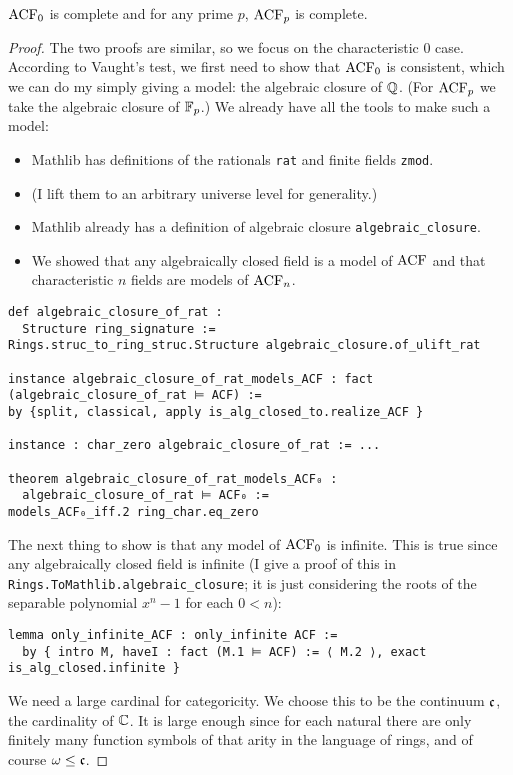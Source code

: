 \begin{prop}
  $\operatorname{ACF}_{0}$ is complete and for any prime $p$, $\operatorname{ACF}_{p}$ is complete.
\end{prop}
\begin{proof}
  The two proofs are similar, so we focus on the characteristic $0$ case.
  According to Vaught's test, we first need to show that $\operatorname{ACF}_{0}$ is consistent,
  which we can do my simply giving a model: the algebraic closure of $\mathbb{Q}$.
  (For $\operatorname{ACF}_{p}$ we take the algebraic closure of $\mathbb{F}_{p}$.)
  We already have all the tools to make such a model:
  \begin{itemize}
    \item Mathlib has definitions of the rationals \texttt{rat} and finite fields \texttt{zmod}.
    \item (I lift them to an arbitrary universe level for generality.)
    \item Mathlib already has a definition of algebraic closure \texttt{algebraic\_closure}.
    \item We showed that any algebraically closed field is a model of $\operatorname{ACF}$
          and that characteristic $n$ fields are models of $\operatorname{ACF}_{n}$.
  \end{itemize}
  \begin{lstlisting}
def algebraic_closure_of_rat :
  Structure ring_signature :=
Rings.struc_to_ring_struc.Structure algebraic_closure.of_ulift_rat

instance algebraic_closure_of_rat_models_ACF : fact (algebraic_closure_of_rat ⊨ ACF) :=
by {split, classical, apply is_alg_closed_to.realize_ACF }

instance : char_zero algebraic_closure_of_rat := ...

theorem algebraic_closure_of_rat_models_ACF₀ :
  algebraic_closure_of_rat ⊨ ACF₀ :=
models_ACF₀_iff.2 ring_char.eq_zero \end{lstlisting}

The next thing to show is that any model of $\operatorname{ACF}_{0}$ is infinite.
This is true since any algebraically closed field is infinite
(I give a proof of this in \texttt{Rings.ToMathlib.algebraic\_closure};
it is just considering the roots of the separable polynomial $x^{n} - 1$ for each $0 < n$):
\begin{lstlisting}
lemma only_infinite_ACF : only_infinite ACF :=
  by { intro M, haveI : fact (M.1 ⊨ ACF) := ⟨ M.2 ⟩, exact is_alg_closed.infinite }\end{lstlisting}

We need a large cardinal for categoricity.
We choose this to be the continuum $\mathfrak{c}$, the cardinality of $\mathbb{C}$.
It is large enough since for each natural there are only finitely many function symbols
of that arity in the language of rings, and of course $\omega \le \mathfrak{c}$.


\end{proof}

